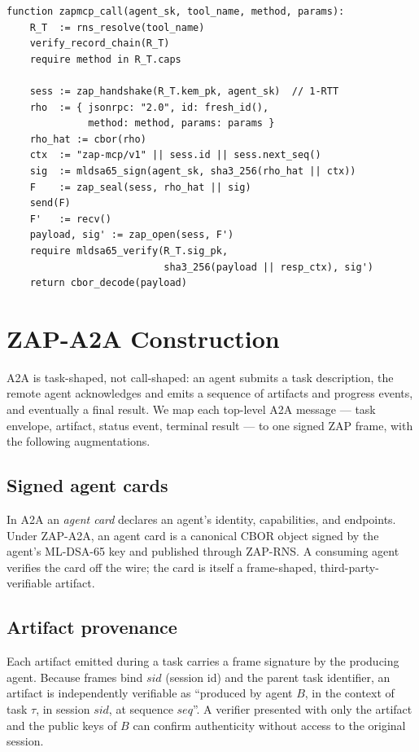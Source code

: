 \documentclass[11pt,a4paper]{article}
\theoremstyle{definition}
\theoremstyle{remark}
\newcommand{\zap}{\textsf{ZAP}\xspace}
\newcommand{\zapaa}{\textsf{ZAP-A2A}\xspace}
\newcommand{\aatwo}{\textsf{A2A}\xspace}
\newcommand{\rns}{\textsf{ZAP-RNS}\xspace}
\begin{document}
\begin{lstlisting}[basicstyle=\footnotesize\ttfamily,frame=single,
                   xleftmargin=1em,framesep=0.5em]
function zapmcp_call(agent_sk, tool_name, method, params):
    R_T  := rns_resolve(tool_name)
    verify_record_chain(R_T)
    require method in R_T.caps

    sess := zap_handshake(R_T.kem_pk, agent_sk)  // 1-RTT
    rho  := { jsonrpc: "2.0", id: fresh_id(),
              method: method, params: params }
    rho_hat := cbor(rho)
    ctx  := "zap-mcp/v1" || sess.id || sess.next_seq()
    sig  := mldsa65_sign(agent_sk, sha3_256(rho_hat || ctx))
    F    := zap_seal(sess, rho_hat || sig)
    send(F)
    F'   := recv()
    payload, sig' := zap_open(sess, F')
    require mldsa65_verify(R_T.sig_pk,
                           sha3_256(payload || resp_ctx), sig')
    return cbor_decode(payload)
\end{lstlisting}

\section{\zapaa{} Construction}\label{sec:zap-a2a}

\aatwo{} is task-shaped, not call-shaped: an agent submits a task
description, the remote agent acknowledges and emits a sequence of
artifacts and progress events, and eventually a final result. We map
each top-level \aatwo{} message --- task envelope, artifact, status
event, terminal result --- to one signed \zap{} frame, with the
following augmentations.

\subsection{Signed agent cards}

In \aatwo{} an \emph{agent card} declares an agent's identity,
capabilities, and endpoints. Under \zapaa{}, an agent card is a
canonical CBOR object signed by the agent's ML-DSA-65 key and published
through \rns{}. A consuming agent verifies the card off the wire; the
card is itself a frame-shaped, third-party-verifiable artifact.

\subsection{Artifact provenance}

Each artifact emitted during a task carries a frame signature by the
producing agent. Because frames bind $\mathit{sid}$ (session id) and
the parent task identifier, an artifact is independently verifiable as
``produced by agent $B$, in the context of task $\tau$, in session
$\mathit{sid}$, at sequence $\mathit{seq}$''. A verifier presented with
only the artifact and the public keys of $B$ can confirm authenticity
without access to the original session.
\end{document}

